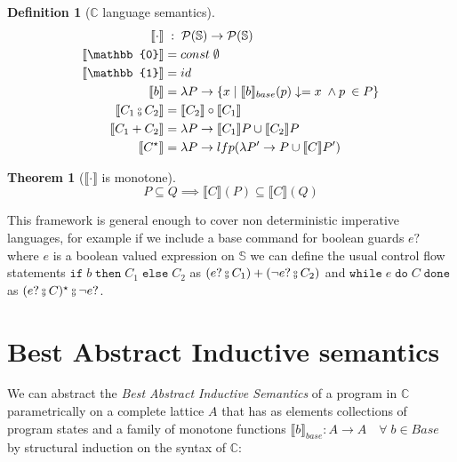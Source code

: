 \documentclass{article}
\newtheorem{definition}{Definition}
\newtheorem{theorem}{Theorem}
\def\rr{\rightarrow}
\newcommand*{\sem}[1]{
    \llbracket #1 \rrbracket
}
\newcommand{\basesem}[2][A]{
    \sem{#2}_{base}
}
\def\fcmp{\mathbin{\raise 0.6ex\hbox{\oalign{\hfil$\scriptscriptstyle      
    \mathrm{o}$\hfil\cr\hfil$\scriptscriptstyle\mathrm{9}$\hfil}}}}
\def\rr{\rightarrow}
\def\lang{\mathbb{C}}
\def\state{\mathbb{S}}
\def\pow{\mathcal{P}}
\begin{document}
    \begin{definition}[$\lang$ language semantics]
        \begin{align*}
            \sem{\cdot}         & \;:\; \pow(\state) \rr \pow(\state) \\
            \sem{\mathbb{0}}    &= const \; \emptyset \\
            \sem{\mathbb{1}}    &= id \\
            \sem{b}             &= \lambda P \rr \{ x 
                \mid \basesem{b}(p)\downarrow = x \; \land p \: \in P \} \\
            \sem{C_1 \fcmp C_2} &= \sem{C_2} \circ \sem{C_1} \\
            \sem{C_1 + C_2}     &= \lambda P \rr \sem{C_1} P \cup \sem{C_2} P \\
            \sem{C^\star}       &= \lambda P \rr lfp(\lambda P' \rr
                P \cup \sem{C} P')
        \end{align*}
    \end{definition}

    \begin{theorem}[$\sem{\cdot}$ is monotone]
        $$P \subseteq Q \implies \sem{C}(P) \subseteq \sem{C}(Q)$$
    \end{theorem}

    This framework is general enough to cover non deterministic imperative 
    languages, for example if we include a base command for boolean guards $e?$
    where $e$ is a boolean valued expression on $\state$ we can define the 
    usual control flow statements $\texttt{if} \; b \; \texttt{then} \; C_1 \; 
    \texttt{else} \; C_2$ as $(e ? \fcmp C_1) + (\neg e ? \fcmp C_2)$ and
    $\texttt{while} \; e \; \texttt{do} \; C \; \texttt{done}$ as $(e? \fcmp
    C)^\star \fcmp \neg e ?$.

\section{Best Abstract Inductive semantics}
    We can abstract the \textit{Best Abstract Inductive Semantics} of a program 
    in $\lang$ parametrically on a complete lattice $A$ that has as elements 
    collections of program states and a family of monotone functions 
    $\basesem{b} : A \rr A \quad \forall \; b \in Base$ by structural 
    induction on the syntax of $\lang$:
\end{document}
